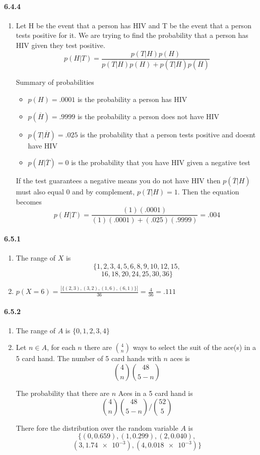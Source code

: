\documentclass[11pt, letterpaper, twocolumn, fleqn]{article}
\begin{document}
\paragraph{6.4.4}
\begin{enumerate}
  \item Let H be the event that a person has HIV and T be the event that a person tests positive for it. We are trying to find the probability that a person has HIV given they test positive.
    $$p(H|T) = \frac{p(T|H)p(H)}{p(T|H)p(H) + p(T|\overline{H})p(\overline{H})}$$
  
  Summary of probabilities
  \begin{itemize}
    \item $p(H) = .0001$ is the probability a person has HIV
    \item $p(\overline{H}) = .9999$ is the probability a person does not have HIV
    \item $p(T|\overline{H}) = .025$ is the probability that a person tests positive and doesnt have HIV
    \item $p(H|\overline{T}) = 0$ is the probability that you have HIV given a negative test
  \end{itemize} 
  
  If the test guarantees a negative means you do not have HIV then  $p(\overline{T}|H)$ must also equal 0 and by complement, $p(T|H) = 1$. Then the equation becomes
    $$p(H|T) = \frac{(1)(.0001)}{(1)(.0001)+(.025)(.9999)} = .004$$
\end{enumerate}

\paragraph{6.5.1}
\begin{enumerate}
  \item The range of $X$ is 
    $$\{1,2,3,4,5,6,8,9,10,12,15,$$
    $$16,18,20,24,25,30,36\}$$
  \item $p(X = 6) = \frac{|\{(2,3),(3,2),(1,6),(6,1)\}|}{36} = \frac{4}{36} = .111$
\end{enumerate}

\paragraph{6.5.2}
\begin{enumerate}
  \item The range of $A$ is $\{0,1,2,3,4\}$
  \item 
    Let $n \in A$, for each $n$ there are $\binom{4}{n}$ ways to select the suit of the ace(s) in a 5 card hand. The number of 5 card hands with $n$ aces is 
      $$\binom{4}{n} \binom{48}{5-n}$$
      
    The probability that there are $n$ Aces in a 5 card hand is 
      $$\binom{4}{n} \binom{48}{5-n} / \binom{52}{5}$$
    
    There fore the distribution over the random variable $A$ is
      $$\{(0,0.659),(1,0.299),(2,0.040),$$
      $$(3,\num{1.74e-3}),(4,\num{0.018e-3})\}$$
\end{enumerate}
\end{document}
